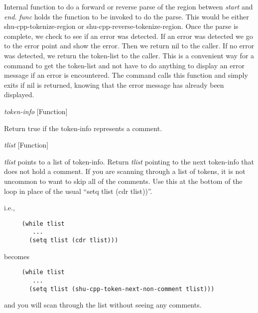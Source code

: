 \begin{doc-string}
Internal function to do a forward or reverse parse of the region between \emph{start}
and \emph{end}.  \emph{func} holds the function to be invoked to do the parse.  This would be
either shu-cpp-tokenize-region or shu-cpp-reverse-tokenize-region.  Once the
parse is complete, we check to see if an error was detected.  If an error was
detected we go to the error point and show the error.  Then we return nil to the
caller.  If no error was detected, we return the token-list to the caller.  This
is a convenient way for a command to get the token-list and not have to do anything
to display an error message if an error is encountered.  The command calls this
function and simply exits if nil is returned, knowing that the error message has
already been displayed.
\end{doc-string}

\vspace{1em}
\noindent
{}
\usebox{\funcname}\emph{token-info}
 \hfill [Function]

\begin{doc-string}
Return true if the token-info represents a comment.
\end{doc-string}

\vspace{1em}
\noindent
{}
\usebox{\funcname}\emph{tlist}
 \hfill [Function]

\begin{doc-string}
\emph{tlist} points to a list of token-info.  Return \emph{tlist} pointing to the next
token-info that does not hold a comment.  If you are scanning through a list
of tokens, it is not uncommon to want to skip all of the comments.  Use this
at the bottom of the loop in place of the usual ``setq tlist (cdr tlist))''.

i.e.,

\small{\begin{verbatim}
     (while tlist
        ...
       (setq tlist (cdr tlist)))
\end{verbatim}}

becomes

\small{\begin{verbatim}
     (while tlist
        ...
       (setq tlist (shu-cpp-token-next-non-comment tlist)))
\end{verbatim}}

and you will scan through the list without seeing any comments.
\end{doc-string}


